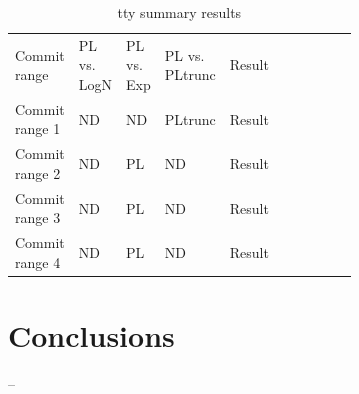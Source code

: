 \documentclass[conference]{IEEEtran}
\begin{document}
\begin{table}[h!tbp]
	\caption{tty summary results}
	\begin{center}
		\begin{tabular}{| p{0.12\linewidth} | p{0.08\linewidth} | p{0.08\linewidth} | p{0.08\linewidth} | p{0.1\linewidth} |p{0.13\linewidth} | p{0.09\linewidth} |}
			\hline
                  Commit range & PL vs. LogN & PL vs. Exp & PL vs. PLtrunc & Result \\
                  Commit range 1 & ND & ND  & PLtrunc & Result \\
                  Commit range 2& ND & PL  & ND & Result \\
                  Commit range 3& ND  &  PL & ND & Result \\
                  Commit range 4& ND & PL  & ND & Result \\
			\hline

			\hline
		\end{tabular}
	\end{center}
\label{tab:2019teststty}
\end{table}




\section{Conclusions}\label{conc}
--

 
\end{document}
